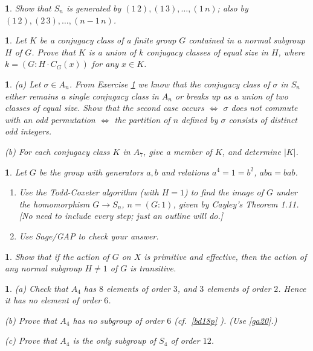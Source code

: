 \documentclass[a4paper,11pt,final,openany]{memoir}%
\newtheorem{exercise}[Y]{}
\theoremstyle{nonumberplain}
\begin{document}
\begin{exercise}
\label{x26} Show that $S_{n}$ is generated by $(1\,2),(1\,3),\ldots,(1\,n)$;
also by $(1\,2),(2\,3),\ldots,(n-1\,n)$.
\end{exercise}

\begin{exercise}
\label{x27} Let $K$ be a conjugacy class of a finite group $G$ contained in a
normal subgroup $H$ of $G$. Prove that $K$ is a union of $k$ conjugacy classes
of equal size in $H$, where $k=(G:H\cdot C_{G}(x))$ for any $x\in K$.

\end{exercise}

\begin{exercise}
\label{x28} (a) Let $\sigma\in A_{n}$. From Exercise \ref{x27} we know that
the conjugacy class of $\sigma$ in $S_{n}$ either remains a single conjugacy
class in $A_{n}$ or breaks up as a union of two classes of equal size. Show
that the second case occurs $\iff$ $\sigma$ does not commute with an odd
permutation $\iff$ the partition of $n$ defined by $\sigma$ consists of
distinct odd integers.

\noindent(b) For each conjugacy class $K$ in $A_{7}$, give a member of $K$,
and determine $|K|$.

\end{exercise}

\begin{exercise}
\label{x29} Let $G$ be the group with generators $a,b$ and relations
$a^{4}=1=b^{2}$, $aba=bab$.

\begin{enumerate}
\item Use the Todd-Coxeter algorithm (with $H=1$) to find the image of $G$
under the homomorphism $G\rightarrow S_{n}$, $n=(G:1)$, given by Cayley's
Theorem 1.11. [No need to include every step; just an outline will do.]

\item Use Sage/GAP to check your answer.
\end{enumerate}
\end{exercise}

\begin{exercise}
\label{x30} Show that if the action of $G$ on $X$ is primitive and effective,
then the action of any normal subgroup $H\neq1$ of $G$ is transitive.
\end{exercise}

\begin{exercise}
\label{x31} (a) Check that $A_{4}$ has $8$ elements of order $3$, and $3$
elements of order $2$. Hence it has no element of order $6$.

\noindent(b) Prove that $A_{4}$ has no subgroup of order $6$ (cf.\ \ref{bd18p}%
). (Use \ref{ga20}.)

\noindent(c) Prove that $A_{4}$ is the only subgroup of $S_{4}$ of order $12$.
\end{exercise}
\end{document}
